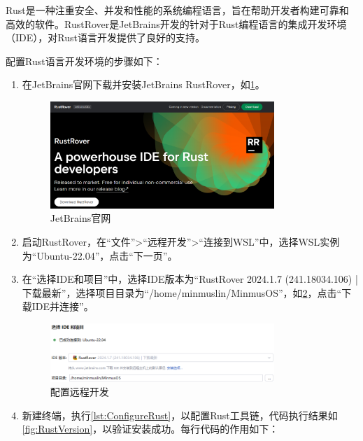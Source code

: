 Rust是一种注重安全、并发和性能的系统编程语言，旨在帮助开发者构建可靠和高效的软件。RustRover是JetBrains开发的针对于Rust编程语言的集成开发环境（IDE），对Rust语言开发提供了良好的支持。

配置Rust语言开发环境的步骤如下：

\begin{enumerate}
    \item 在JetBrains官网下载并安装JetBrains RustRover，如\cref{fig:RustRoverWebsite}。
          \begin{figure}[htbp]
              \centering
              \includegraphics[width=0.8\textwidth]{figures/RustRoverWebsite.png}
              \caption{JetBrains官网}
              \label{fig:RustRoverWebsite}
          \end{figure}
    \item 启动RustRover，在“文件”>“远程开发”>“连接到WSL”中，选择WSL实例为“Ubuntu-22.04”，点击“下一页”。
    \item 在“选择IDE和项目”中，选择IDE版本为“RustRover 2024.1.7 (241.18034.106) | 下载最新”，选择项目目录为“/home/minmuslin/MinmusOS”，如\cref{fig:ConfigureRemoteDevelopment}，点击“下载IDE并连接”。
          \begin{figure}[htbp]
              \centering
              \includegraphics[width=0.8\textwidth]{figures/ConfigureRemoteDevelopment.png}
              \caption{配置远程开发}
              \label{fig:ConfigureRemoteDevelopment}
          \end{figure}
    \item 新建终端，执行\cref{lst:ConfigureRust}，以配置Rust工具链，代码执行结果如\cref{fig:RustVersion}，以验证安装成功。每行代码的作用如下：
          \begin{enumerate}

\end{enumerate}
\end{enumerate}
